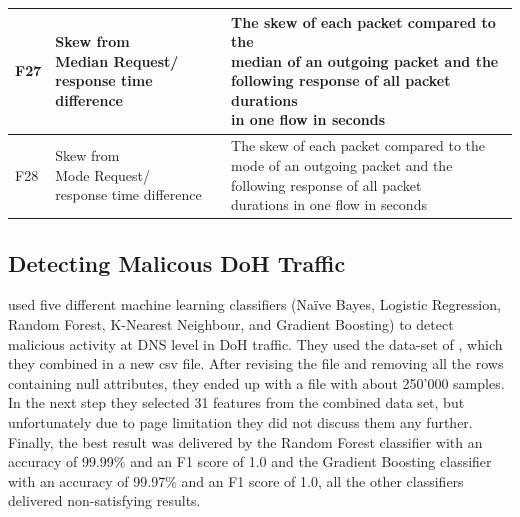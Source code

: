 \begin{center}
\begin{longtable}{ |l|l|l| }
\hline
F27 & \makecell{Skew from \\ Median Request/ \\ response time difference} & \makecell{The skew of each packet compared to the \\ median of an outgoing packet and the \\ following response of all packet durations \\ in one flow in seconds} \\
\hline
F28 & \makecell{Skew from \\ Mode Request/ \\ response time difference} & \makecell{The skew of each packet compared to the \\ mode of an outgoing packet and the \\ following response of all packet \\ durations in one flow in seconds} \\
\hline
\end{longtable}
 \label{tab:packetResponse}
\end{center}


\subsection{Detecting Malicous DoH Traffic} \label{malicious}
\cite{SinghRoy_DetectingMalicousDoHTrafficML} used five different machine learning classifiers (Naïve Bayes, Logistic Regression, Random Forest, K-Nearest Neighbour, and Gradient Boosting) to detect malicious activity at DNS level in DoH traffic. They used the data-set of \cite{montazerishatoori2020anomaly}, which they combined in a new csv file. After revising the file and removing all the rows containing null attributes, they ended up with a file with about 250’000 samples. In the next step they selected 31 features from the combined data set, but unfortunately due to page limitation they did not discuss them any further. Finally, the best result was delivered by the Random Forest classifier with an accuracy of 99.99\% and an F1 score of 1.0 and the Gradient Boosting classifier with an accuracy of 99.97\% and an F1 score of 1.0, all the other classifiers delivered non-satisfying results.


